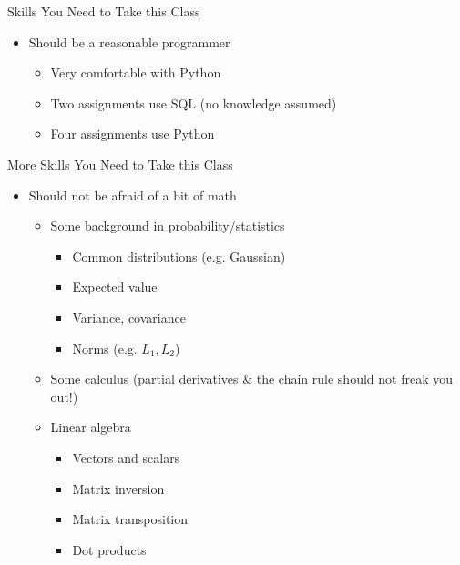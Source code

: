 \documentclass[aspectratio=169]{beamer}
\begin{document}

\begin{frame}{Skills You Need to Take this Class}
    \begin{itemize}
\item Should be a reasonable programmer
	\begin{itemize}
	\item Very comfortable with Python
	\item Two assignments use SQL (no knowledge assumed)
	\item Four assignments use Python
        \end{itemize}
    \end{itemize}
\end{frame}

\begin{frame}{More Skills You Need to Take this Class}

   \begin{itemize}
\item  Should not be afraid of a bit of math  
	\begin{itemize}
	\item Some background in probability/statistics
	\begin{itemize}
	\item Common distributions (e.g. Gaussian)
	\item Expected value
	\item Variance, covariance
	\item Norms (e.g. $L_1, L_2$)
	\end{itemize}
	\item Some calculus (partial derivatives \& the chain rule should not freak you out!)
	\item Linear algebra
	\begin{itemize}
	\item Vectors and scalars
	\item Matrix inversion
	\item Matrix transposition
	\item Dot products
	\end{itemize}
	\end{itemize}
    \end{itemize}
    

\end{frame}


\end{document}
